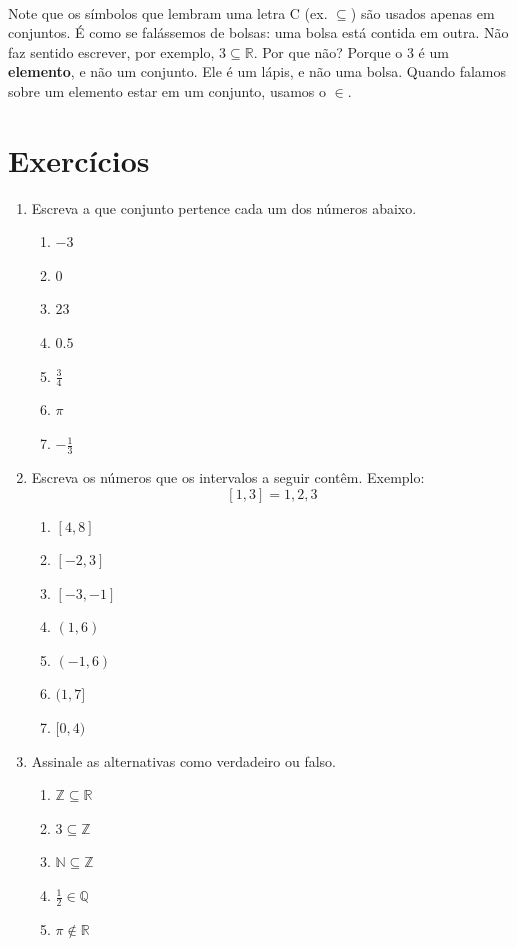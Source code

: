 \documentclass[11pt]{article}
\begin{document}
\paragraph{}
Note que os símbolos que lembram uma letra C (ex. $\subseteq$) são usados
apenas em conjuntos. É como se falássemos de bolsas: uma bolsa está contida
em outra. Não faz sentido escrever, por exemplo, $3 \subseteq \mathbb{R}$.
Por que não? Porque o 3 é um \textbf{elemento}, e não um conjunto. Ele é um
lápis, e não uma bolsa. Quando falamos sobre um elemento estar em um conjunto,
usamos o $\in$.

\section{Exercícios}
\begin{enumerate}
	\item Escreva a que conjunto pertence cada um dos números abaixo.
	\begin{enumerate}
		\item $-3$
		\item $0$
		\item $23$
		\item $0.5$
		\item $\frac{3}{4}$
		\item $\pi$
		\item $-\frac{1}{3}$
	\end{enumerate}

	\item Escreva os números que os intervalos a seguir contêm. Exemplo:
		  $$[1,3] = 1,2,3$$
	\begin{enumerate}
		\item $[4,8]$
		\item $[-2,3]$
		\item $[-3,-1]$
		\item $(1,6)$
		\item $(-1,6)$
		\item $(1,7]$
		\item $[0,4)$
	\end{enumerate}

	\item Assinale as alternativas como verdadeiro ou falso.
	\begin{enumerate}
		\item $\mathbb{Z} \subseteq \mathbb{R}$
		\item $3 \subseteq \mathbb{Z}$
		\item $\mathbb{N} \subseteq \mathbb{Z}$
		\item $\frac{1}{2} \in \mathbb{Q}$
		\item $\pi \not\in \mathbb{R}$
	\end{enumerate}
\end{enumerate}
\end{document}
